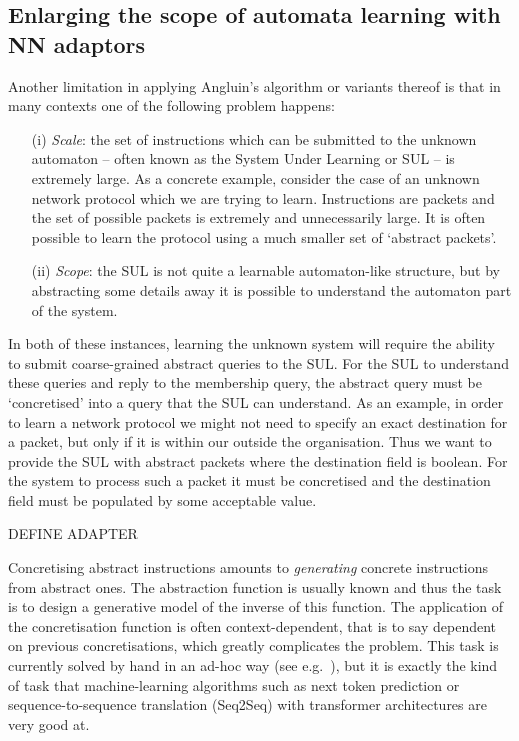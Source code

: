 \documentclass[11pt,a4paper]{article}
\begin{document}
		
		\subsection{Enlarging the scope of automata learning with NN adaptors}
		Another limitation in applying Angluin's algorithm or variants thereof is that in many contexts one of the following problem happens:
		\begin{itemize}
			\item[(i)] \emph{Scale}: the set of instructions which can be submitted to the unknown automaton -- often known as the System Under Learning or SUL -- is extremely large. As a concrete example, consider the case of an unknown network protocol which we are trying to learn. Instructions are packets and the set of possible packets is extremely and unnecessarily large. It is often possible to learn the protocol using a much smaller set of `abstract packets'.
			\item[(ii)] \emph{Scope}: the SUL is not quite a learnable automaton-like structure, but by abstracting some details away it is possible to understand the automaton part of the system.
		\end{itemize}
		
		In both of these instances, learning the unknown system will require the ability to submit coarse-grained abstract queries to the SUL. For the SUL to understand these queries and reply to the membership query, the abstract query must be `concretised' into a query that the SUL can understand.  As an example, in order to learn a network protocol we might not need to specify an exact destination for a packet, but only if it is within our outside the organisation. Thus we want to provide the SUL with abstract packets where the destination field is boolean. For the system to process such a packet it must be concretised and the destination field must be populated by some acceptable value.
		
		DEFINE ADAPTER
		
		Concretising abstract instructions amounts to \emph{generating} concrete instructions from abstract ones. The abstraction function is usually known and thus the task is to design a generative model of the inverse of this function. The application of the concretisation function is often context-dependent, that is to say dependent on previous concretisations, which greatly complicates the problem. This task is currently solved by hand in an ad-hoc way (see e.g.\ \cite{ferreira2021prognosis}), but it is exactly the kind of task that machine-learning algorithms such as next token prediction or sequence-to-sequence translation (Seq2Seq) with transformer architectures are very good at. 
		
\end{document}
